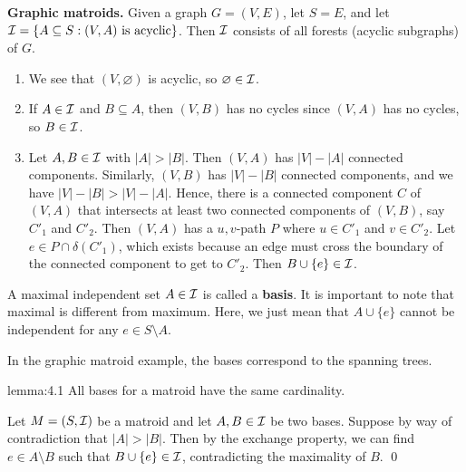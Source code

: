{\bf Graphic matroids.} Given a graph $G = (V, E)$, let $S = E$, and let 
${\cal I} = \{A \subseteq S : (V, A) \text{ is acyclic}\}$. Then ${\cal I}$ 
consists of all forests (acyclic subgraphs) of $G$.
\begin{enumerate}[(1)]
    \item We see that $(V, \varnothing)$ is acyclic, so $\varnothing \in {\cal I}$. 
    \item If $A \in {\cal I}$ and $B \subseteq A$, then $(V, B)$ has no cycles 
    since $(V, A)$ has no cycles, so $B \in {\cal I}$. 
    \item Let $A, B \in {\cal I}$ with $|A| > |B|$. Then $(V, A)$ has 
    $|V| - |A|$ connected components. Similarly, $(V, B)$ has 
    $|V| - |B|$ connected components, and we have $|V| - |B| > |V| - |A|$. 
    Hence, there is a connected component $C$ of $(V, A)$ that intersects 
    at least two connected components of $(V, B)$, say $C'_1$ and $C'_2$.
    Then $(V, A)$ has a $u, v$-path $P$ where $u \in C'_1$ and 
    $v \in C'_2$. Let $e \in P \cap \delta(C'_1)$, which exists because 
    an edge must cross the boundary of the connected component to 
    get to $C'_2$. Then $B \cup \{e\} \in {\cal I}$.
\end{enumerate}

A maximal independent set $A \in {\cal I}$ is called a {\bf basis}.
It is important to note that maximal is different from maximum. 
Here, we just mean that $A \cup \{e\}$ cannot be independent for any 
$e \in S \setminus A$. 

In the graphic matroid example, the bases correspond to the spanning trees.

\begin{lemma}{lemma:4.1}
    All bases for a matroid have the same cardinality.
\end{lemma}\vspace{-0.25cm}
\begin{pf}
    Let $M = (S, {\cal I})$ be a matroid and let $A, B \in {\cal I}$ be 
    two bases. Suppose by way of contradiction that $|A| > |B|$. 
    Then by the exchange property, we can find $e \in A \setminus B$ 
    such that $B \cup \{e\} \in {\cal I}$, contradicting the maximality of $B$. \qed
\end{pf}\vspace{-0.25cm}

